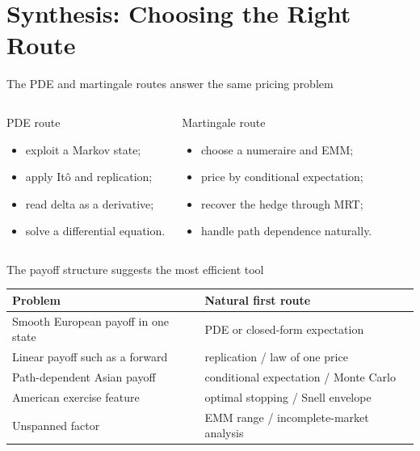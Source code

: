 \documentclass[handout,10pt,aspectratio=169]{beamer}
\newcommand{\1}{\mathbf 1}
\begin{document}
\section{Synthesis: Choosing the Right Route}

\begin{frame}{The PDE and martingale routes answer the same pricing problem}
\begin{columns}[T,onlytextwidth]
\begin{block}{PDE route}
\begin{itemize}
  \item exploit a Markov state;
  \item apply It\^o and replication;
  \item read delta as a derivative;
  \item solve a differential equation.
\end{itemize}
\end{block}
\begin{exampleblock}{Martingale route}
\begin{itemize}
  \item choose a numeraire and EMM;
  \item price by conditional expectation;
  \item recover the hedge through MRT;
  \item handle path dependence naturally.
\end{itemize}
\end{exampleblock}
\end{columns}
\end{frame}

\begin{frame}{The payoff structure suggests the most efficient tool}
\begin{center}
\begin{tabular}{p{}p{}}
\toprule
Problem & Natural first route\\
\midrule
Smooth European payoff in one state & PDE or closed-form expectation\\
Linear payoff such as a forward & replication / law of one price\\
Path-dependent Asian payoff & conditional expectation / Monte Carlo\\
American exercise feature & optimal stopping / Snell envelope\\
Unspanned factor & EMM range / incomplete-market analysis\\
\bottomrule
\end{tabular}
\end{center}
\end{frame}
\end{document}
